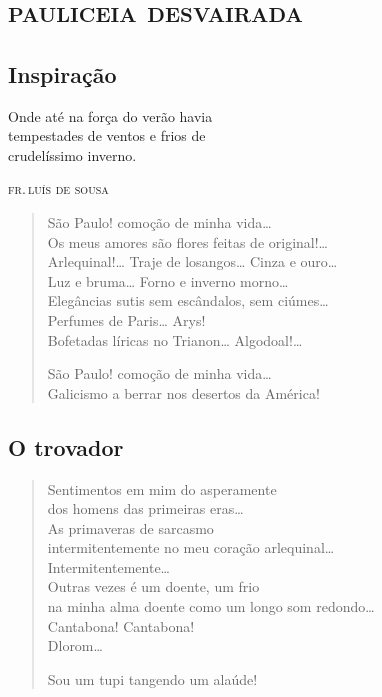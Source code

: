 \movetooddpage
\part{\textsc{pauliceia desvairada}}

\chapter{Inspiração}
\openany

{\setlength{\epigraphwidth}{.45\textwidth}
\epigraph{Onde até na força do verão havia\\
tempestades de ventos e frios de\\
crudelíssimo inverno.}{\textsc{fr.\,luís de sousa}}}


\begin{verse}
São Paulo! comoção de minha vida\ldots{}\\
Os meus amores são flores feitas de original!\ldots{}\\
Arlequinal!\ldots{} Traje de losangos\ldots{} Cinza e ouro\ldots{}\\
Luz e bruma\ldots{} Forno e inverno morno\ldots{}\\
Elegâncias sutis sem escândalos, sem ciúmes\ldots{}\\
Perfumes de Paris\ldots{} Arys!\\
Bofetadas líricas no Trianon\ldots{} Algodoal!\ldots{}

São Paulo! comoção de minha vida\ldots{}\\
Galicismo a berrar nos desertos da América!
\end{verse}

\chapter{O trovador}

\begin{verse}
Sentimentos em mim do asperamente\\
dos homens das primeiras eras\ldots{}\\
As primaveras de sarcasmo\\
intermitentemente no meu coração arlequinal\ldots{}\\
Intermitentemente\ldots{}\\
Outras vezes é um doente, um frio\\
na minha alma doente como um longo som redondo\ldots{}\\
Cantabona! Cantabona!\\
Dlorom\ldots{}

Sou um tupi tangendo um alaúde!
\end{verse}

